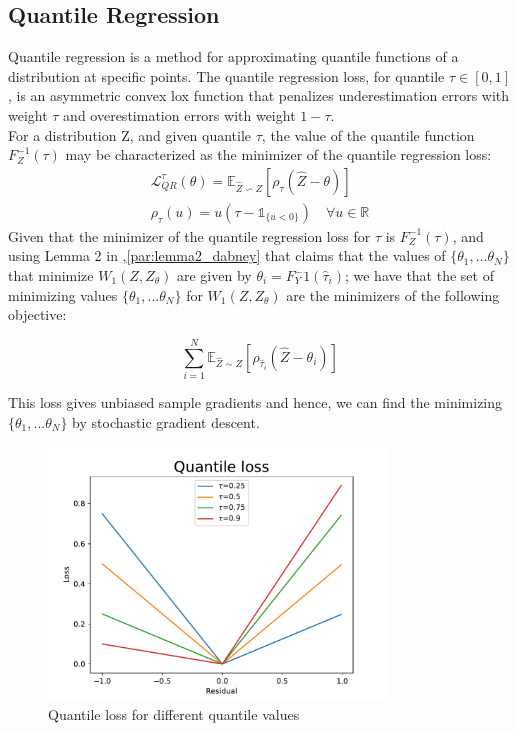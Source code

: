 \subsection{Quantile Regression}
Quantile regression is a method for approximating quantile functions of a distribution at specific points.
The quantile regression loss, for quantile $\tau \in [0,1]$, is an asymmetric convex lox function
that penalizes underestimation errors with weight $\tau$ and overestimation errors
with weight $1-\tau$. \\
For a distribution Z, and given quantile $\tau$, the value of the quantile function $F_Z^{-1}(\tau)$
may be characterized as the minimizer of the quantile regression loss:
\begin{align}
    \mathcal{L}_{QR}^{\tau}(\theta)=\mathbb E_{\hat{Z}\backsim Z}[\rho_\tau(\hat{Z}-\theta) ] \label{eq:quantile_loss}\\
    \rho_\tau(u)=u(\tau - \mathds{1}_{\{u<0\}}) \quad \forall u \in \mathbb{R} \nonumber
\end{align}
Given that the minimizer of the quantile regression loss for $\tau$ is $F_Z^{-1}(\tau)$, and 
using Lemma 2 in \cite{Dabney2018a},\ref{par:lemma2_dabney} that claims that the values 
of $\{\theta_1, ... \theta_N\}$ that minimize
 $W_1(Z,Z_\theta)$ are given by $\theta_i = F_Y^-1(\hat\tau_i)$; we have that the set of minimizing
 values $\{\theta_1, ... \theta_N\}$ for  $W_1(Z,Z_\theta)$ are the minimizers of the 
 following objective:

\begin{equation}
    \sum_{i=1}^{N} \mathbb E_{\hat{Z} \sim Z} [ \rho_{\hat\tau_i}(\hat{Z}-\theta_i)]
\end{equation}

This loss gives unbiased sample gradients and hence, we can find the minimizing $\{\theta_1, ... \theta_N\}$
by stochastic gradient descent.

\begin{figure}[ht]
    \centering
    \includegraphics[width=0.8\textwidth]{images/quantile_loss.pdf}
    \caption{Quantile loss for different quantile values}
    \label{quantile_loss}
\end{figure}


